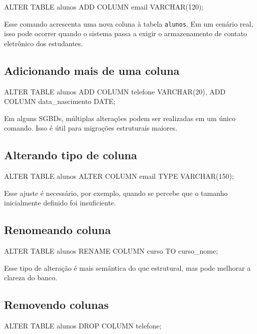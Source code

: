 \begin{sqlcode}
ALTER TABLE alunos
ADD COLUMN email VARCHAR(120);
\end{sqlcode}

Esse comando acrescenta uma nova coluna à tabela \texttt{alunos}. Em um cenário real, isso pode ocorrer quando o sistema passa a exigir o armazenamento de contato eletrônico dos estudantes.

\subsection{Adicionando mais de uma coluna}

\begin{sqlcode}
ALTER TABLE alunos
ADD COLUMN telefone VARCHAR(20),
ADD COLUMN data_nascimento DATE;
\end{sqlcode}

Em alguns SGBDs, múltiplas alterações podem ser realizadas em um único comando. Isso é útil para migrações estruturais maiores.

\subsection{Alterando tipo de coluna}

\begin{sqlcode}
ALTER TABLE alunos
ALTER COLUMN email TYPE VARCHAR(150);
\end{sqlcode}

Esse ajuste é necessário, por exemplo, quando se percebe que o tamanho inicialmente definido foi insuficiente.

\subsection{Renomeando coluna}

\begin{sqlcode}
ALTER TABLE alunos
RENAME COLUMN curso TO curso_nome;
\end{sqlcode}

Esse tipo de alteração é mais semântica do que estrutural, mas pode melhorar a clareza do banco.

\subsection{Removendo colunas}

\begin{sqlcode}
ALTER TABLE alunos
DROP COLUMN telefone;
\end{sqlcode}

